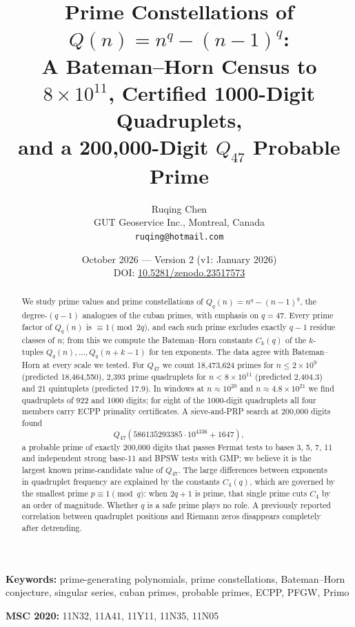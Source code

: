 \documentclass[11pt,a4paper]{article}
\title{Prime Constellations of $Q(n) = n^q - (n-1)^q$:\\
A Bateman--Horn Census to $8\times10^{11}$, Certified 1000-Digit Quadruplets,\\
and a 200{,}000-Digit $Q_{47}$ Probable Prime}
\author{Ruqing Chen\\
GUT Geoservice Inc., Montreal, Canada\\
\texttt{ruqing@hotmail.com}}
\date{October 2026 --- Version 2 (v1: January 2026)\\[2pt]
\small DOI: \href{https://doi.org/10.5281/zenodo.23517573}{10.5281/zenodo.23517573}}
\theoremstyle{remark}
\begin{document}
\maketitle

\begin{abstract}
We study prime values and prime constellations of $Q_q(n) = n^q - (n-1)^q$, the degree-$(q-1)$ analogues of the cuban primes, with emphasis on $q = 47$. Every prime factor of $Q_q(n)$ is $\equiv 1 \pmod{2q}$, and each such prime excludes exactly $q-1$ residue classes of $n$; from this we compute the Bateman--Horn constants $C_k(q)$ of the $k$-tuples $Q_q(n),\dots,Q_q(n+k-1)$ for ten exponents. The data agree with Bateman--Horn at every scale we tested. For $Q_{47}$ we count 18,473,624 primes for $n \le 2\times10^9$ (predicted 18,464,550), 2,393 prime quadruplets for $n < 8\times10^{11}$ (predicted 2,404.3) and 21 quintuplets (predicted 17.9). In windows at $n\approx10^{20}$ and $n\approx 4.8\times10^{21}$ we find quadruplets of 922 and 1000 digits; for eight of the 1000-digit quadruplets all four members carry ECPP primality certificates. A sieve-and-PRP search at 200,000 digits found
\[
Q_{47}(586135293385\cdot10^{4336}+1647),
\]
a probable prime of exactly 200,000 digits that passes Fermat tests to bases 3, 5, 7, 11 and independent strong base-11 and BPSW tests with GMP; we believe it is the largest known prime-candidate value of $Q_{47}$. The large differences between exponents in quadruplet frequency are explained by the constants $C_4(q)$, which are governed by the smallest prime $p\equiv1\pmod q$: when $2q+1$ is prime, that single prime cuts $C_4$ by an order of magnitude. Whether $q$ is a safe prime plays no role. A previously reported correlation between quadruplet positions and Riemann zeros disappears completely after detrending.
\end{abstract}

\noindent\textbf{Keywords:} prime-generating polynomials, prime constellations, Bateman--Horn conjecture, singular series, cuban primes, probable primes, ECPP, PFGW, Primo

\noindent\textbf{MSC 2020:} 11N32, 11A41, 11Y11, 11N35, 11N05
\end{document}
